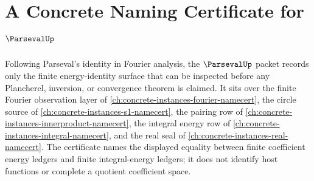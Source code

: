 \chapter{A Concrete Naming Certificate for $\ParsevalUp$}
\label{ch:concrete-instances-parseval-namecert}

Following Parseval's identity in Fourier analysis, the $\ParsevalUp$ packet records only the finite energy-identity surface that can be inspected before any Plancherel, inversion, or convergence theorem is claimed. It sits over the finite Fourier observation layer of \autoref{ch:concrete-instances-fourier-namecert}, the circle source of \autoref{ch:concrete-instances-s1-namecert}, the pairing row of \autoref{ch:concrete-instances-innerproduct-namecert}, the integral energy row of \autoref{ch:concrete-instances-integral-namecert}, and the real seal of \autoref{ch:concrete-instances-real-namecert}. The certificate names the displayed equality between finite coefficient energy ledgers and finite integral-energy ledgers; it does not identify host functions or complete a quotient coefficient space.

